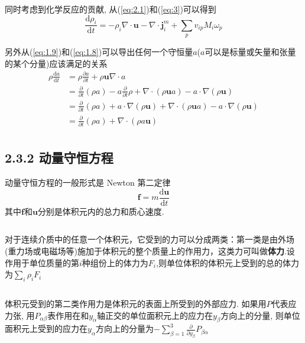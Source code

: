 \documentclass[10pt,aspectratio=43,mathserif,table]{ctexbeamer}
\newcommand{\customref}[1]{(\ref{#1})}
\begin{document}
\begin{frame}
    同时考虑到化学反应的贡献, 从\customref{eq:2.1}和\customref{eq:3}可以得到
    $$
    \frac{\mathrm{d}\rho _i}{\mathrm{d}t}=-\rho _i\nabla \cdot \mathbf{u}-\nabla \cdot \mathbf{j}_{i}^{m}+\sum_p{v_{ip}M_i\omega _p}
    $$
    
    另外从\customref{eq:1.9}和\customref{eq:1.8}可以导出任何一个守恒量$a$($a$可以是标量或矢量和张量的某个分量)应该满足的关系
    \begin{equation}\label{eq:4}
        \begin{aligned}
            \rho \frac{\mathrm{d}a}{\mathrm{d}t}&=\rho \frac{\partial a}{\partial t}+\rho \mathbf{u}\nabla \cdot a\\
            &=\frac{\partial}{\partial t}\left( \rho a \right) -a\frac{\partial}{\partial t}\rho +\nabla \cdot \left( \rho \mathbf{u}a \right) -a\cdot \nabla \left( \rho \mathbf{u} \right)\\
            &=\frac{\partial}{\partial t}\left( \rho a \right) +a\cdot \nabla \left( \rho \mathbf{u} \right) +\nabla \cdot \left( \rho \mathbf{u}a \right) -a\cdot \nabla \left( \rho \mathbf{u} \right)\\
            &=\frac{\partial}{\partial t}\left( \rho a \right) +\nabla \cdot \left( \rho a\mathbf{u} \right)\\
        \end{aligned}
    \end{equation}

\end{frame}

\subsection{2.3.2 动量守恒方程}

\begin{frame}
    动量守恒方程的一般形式是 Newton 第二定律
    $$
    \mathbf{f}=m\frac{\mathrm{d}\mathbf{u}}{\mathrm{d}t}
    $$
    其中$\mathbf{f}$和$\mathbf{u}$分别是体积元内的总力和质心速度.

    $ $

    对于连续介质中的任意一个体积元，它受到的力可以分成两类：第一类是由外场(重力场或电磁场等)施加于体积元的整个质量上的作用力，这类力可叫做\textbf{体力}.设作用于单位质量的第$i$种组份上的体力为$F_i$,则单位体积的体积元上受到的总的体力为$\sum_i{\rho_i F_i}$

    $ $

    体积元受到的第二类作用力是体积元的表面上所受到的外部应力. 如果用$P$代表应力张, 用$P_{\alpha\beta}$表作用在和$y_\alpha$轴正交的单位面积元上的应力在$y_\beta$方向上的分量, 则单位面积元上受到的应力在$y_\alpha$方向上的分量为$-\sum_{\beta =1}^3{\frac{\partial}{\partial y_{\beta}}P_{\beta \alpha}}$

\end{frame}
\end{document}
